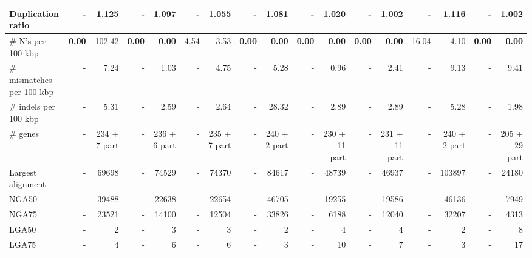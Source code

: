 \documentclass[12pt,a4paper]{article}
\begin{document}
\begin{table}[ht]
\begin{center}
\begin{tabular}{|l*{16}{|r}|}
Duplication ratio & - & 1.125 & - & 1.097 & - & 1.055 & - & 1.081 & - & 1.020 & - & 1.002 & - & 1.116 & - & 1.002 \\ \hline
\# N's per 100 kbp & {\bf 0.00} & 102.42 & {\bf 0.00} & {\bf 0.00} & 4.54 & 3.53 & {\bf 0.00} & {\bf 0.00} & {\bf 0.00} & {\bf 0.00} & {\bf 0.00} & {\bf 0.00} & 16.04 & 4.10 & {\bf 0.00} & {\bf 0.00} \\ \hline
\# mismatches per 100 kbp & - & 7.24 & - & 1.03 & - & 4.75 & - & 5.28 & - & 0.96 & - & 2.41 & - & 9.13 & - & 9.41 \\ \hline
\# indels per 100 kbp & - & 5.31 & - & 2.59 & - & 2.64 & - & 28.32 & - & 2.89 & - & 2.89 & - & 5.28 & - & 1.98 \\ \hline
\# genes & - & 234 + 7 part & - & 236 + 6 part & - & 235 + 7 part & - & 240 + 2 part & - & 230 + 11 part & - & 231 + 11 part & - & 240 + 2 part & - & 205 + 29 part \\ \hline
Largest alignment & - & 69698 & - & 74529 & - & 74370 & - & 84617 & - & 48739 & - & 46937 & - & 103897 & - & 24180 \\ \hline
NGA50 & - & 39488 & - & 22638 & - & 22654 & - & 46705 & - & 19255 & - & 19586 & - & 46136 & - & 7949 \\ \hline
NGA75 & - & 23521 & - & 14100 & - & 12504 & - & 33826 & - & 6188 & - & 12040 & - & 32207 & - & 4313 \\ \hline
LGA50 & - & 2 & - & 3 & - & 3 & - & 2 & - & 4 & - & 4 & - & 2 & - & 8 \\ \hline
LGA75 & - & 4 & - & 6 & - & 6 & - & 3 & - & 10 & - & 7 & - & 3 & - & 17 \\ \hline
\end{tabular}
\end{center}
\end{table}
\end{document}
